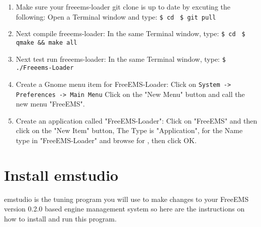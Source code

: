 \documentclass[12pt,notitlepage,onecolumn,oneside,openany]{memoir}
\begin{document}
\begin{enumerate}
\item \textsf{Make sure your freeems-loader git clone is up to date by excuting the following:} \newline
      \textsf{Open a Terminal window and type:} \newline
      \texttt{\$ cd }  \newline
      \texttt{\$ git pull}

\item \textsf{Next compile freeems-loader:} \newline
      \textsf{In the same Terminal window, type:} \newline
      \texttt{\$ cd }  \newline
      \texttt{\$ qmake \&\& make all}

\item \textsf{Next test run freeems-loader:} \newline
      \textsf{In the same Terminal window, type:} \newline
      \texttt{\$ ./Freeems-Loader}

\item \textsf{Create a Gnome menu item for FreeEMS-Loader:} \newline
      \textsf{Click on } \texttt{System -> Preferences -> Main Menu} \newline
      \textsf{Click on the "New Menu" button and call the new menu "FreeEMS".}

\item \textsf{Create an application called "FreeEMS-Loader":} \newline
      \textsf{Click on "FreeEMS" and then click on the "New Item" button,} \newline
      \textsf{The Type is "Application", for the Name type in "FreeEMS-Loader" and browse for} \newline
       \textsf{, then click OK.}
\end{enumerate}

\chapter{\textsf{Install emstudio}}

\textsf{emstudio is the tuning program you will use to make changes to your FreeEMS version 0.2.0 based engine management system so here are the instructions on how to install and run this program.} \newline
\end{document}

